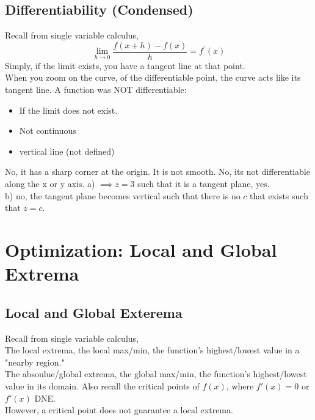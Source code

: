 \documentclass{article}
\begin{document}
\subsection{Differentiability (Condensed)}
  Recall from single variable calculus,
  $$ \lim_{h \rightarrow 0} \frac{f(x+h)-f(x)}{h} = f^{\prime}(x)$$
  Simply, if the limit exists, you have a tangent line at that point.
  \\ When you zoom on the curve, of the differentiable point, the curve acts like its tangent line.
  \double
  A function was NOT differentiable:
  \begin{itemize}
    \item If the limit does not exist.
    \item Not continuous
    \item vertical line (not defined)
  \end{itemize}
\sol No, it has a sharp corner at the origin. It is not smooth.
\sol No, its not differentiable along the x or y axis.
\sol a) $\implies z=3$ such that it is a tangent plane, yes.
\\ b) no, the tangent plane becomes vertical such that there is no $c$ that exists such that $z=c$.

\newpage
\section{Optimization: Local and Global Extrema}
\subsection{Local and Global Exterema}
Recall from single variable calculus,
\\ The local extrema, the local max/min, the function's highest/lowest value in a "nearby region."
\\ The absoulue/global extrema, the global max/min, the function's highest/lowest value in its domain.
\double Also recall the critical points of $f(x)$, where $f'(x) = 0$ or $f'(x)$ DNE.
\\ However, a critical point does not guarantee a local extrema.
\end{document}
